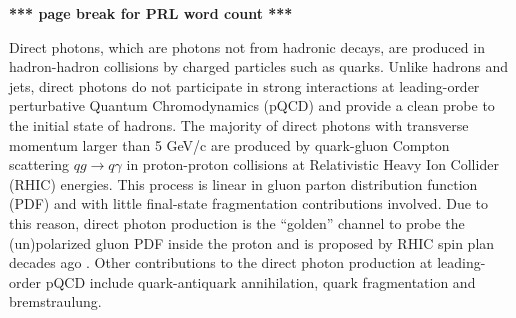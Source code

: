 \documentclass[twocolumn,letterpaper,aps,prl,longbibliography,superscriptaddress,floatfix]{revtex4-2}
\newcommand{\ALL}{\ensuremath{A_{LL}}}
\begin{document}

\textbf{*** page break for PRL word count ***}  \clearpage


Direct photons, which are photons not from hadronic decays, are produced in hadron-hadron collisions by charged particles such as quarks. Unlike hadrons and jets, direct photons do not participate in strong interactions at leading-order perturbative Quantum Chromodynamics (pQCD) and provide a clean probe to the initial state of hadrons. The majority of direct photons with transverse momentum larger than 5 GeV/c are produced by quark-gluon Compton scattering $qg \rightarrow q\gamma$ in proton-proton collisions at Relativistic Heavy Ion Collider (RHIC) energies. This process is linear in gluon parton distribution function (PDF) and with little final-state fragmentation contributions involved. Due to this reason, direct photon production is the ``golden'' channel to probe the (un)polarized gluon PDF inside the proton and is proposed by RHIC spin plan decades ago \cite{aschenauer2015rhic}. Other contributions to the direct photon production at leading-order pQCD include quark-antiquark annihilation, quark fragmentation and bremstraulung.
\end{document}
